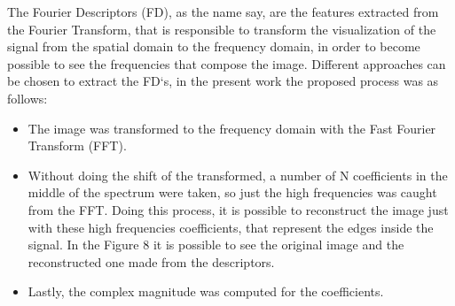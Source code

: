\documentclass[conference]{IEEEtran}
\begin{document}
The Fourier Descriptors (FD), as the name say, are the features extracted from the Fourier Transform, that is responsible to transform the visualization of the signal from the spatial domain to the frequency domain, in order to become possible to see the frequencies that compose the image. Different approaches can be chosen to extract the FD`s, in the present work the proposed process was as follows:
\begin{itemize}
    \item The image was transformed to the frequency domain with the Fast Fourier Transform (FFT).
    \item Without doing the shift of the transformed, a number of N coefficients in the middle of the spectrum were taken, so just the high frequencies was caught from the FFT. Doing this process, it is possible to reconstruct the image just with these high frequencies coefficients, that represent the edges inside the signal. In the Figure 8 it is possible to see the original image and the reconstructed one made from the descriptors.
    \item Lastly, the complex magnitude was computed for the coefficients.
\end{itemize}{}
\end{document}
